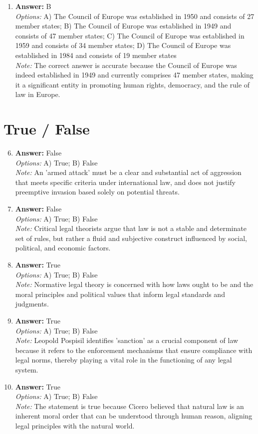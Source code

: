 \documentclass[12pt]{article}
\begin{document}
\begin{enumerate}[label=\arabic*.]
\item \textbf{Answer:} B
\\ \textit{Options:} A) The Council of Europe was established in 1950 and consists of 27 member states; B) The Council of Europe was established in 1949 and consists of 47 member states; C) The Council of Europe was established in 1959 and consists of 34 member states; D) The Council of Europe was established in 1984 and consists of 19 member states
\\ \textit{Note:} The correct answer is accurate because the Council of Europe was indeed established in 1949 and currently comprises 47 member states, making it a significant entity in promoting human rights, democracy, and the rule of law in Europe.
\end{enumerate}

\section*{True / False}
\begin{enumerate}[label=\arabic*.]
\setcounter{enumi}{5}
\item \textbf{Answer:} False
\\ \textit{Options:} A) True; B) False
\\ \textit{Note:} An 'armed attack' must be a clear and substantial act of aggression that meets specific criteria under international law, and does not justify preemptive invasion based solely on potential threats.
\item \textbf{Answer:} False
\\ \textit{Options:} A) True; B) False
\\ \textit{Note:} Critical legal theorists argue that law is not a stable and determinate set of rules, but rather a fluid and subjective construct influenced by social, political, and economic factors.
\item \textbf{Answer:} True
\\ \textit{Options:} A) True; B) False
\\ \textit{Note:} Normative legal theory is concerned with how laws ought to be and the moral principles and political values that inform legal standards and judgments.
\item \textbf{Answer:} True
\\ \textit{Options:} A) True; B) False
\\ \textit{Note:} Leopold Pospisil identifies 'sanction' as a crucial component of law because it refers to the enforcement mechanisms that ensure compliance with legal norms, thereby playing a vital role in the functioning of any legal system.
\item \textbf{Answer:} True
\\ \textit{Options:} A) True; B) False
\\ \textit{Note:} The statement is true because Cicero believed that natural law is an inherent moral order that can be understood through human reason, aligning legal principles with the natural world.
\end{enumerate}
\end{document}
